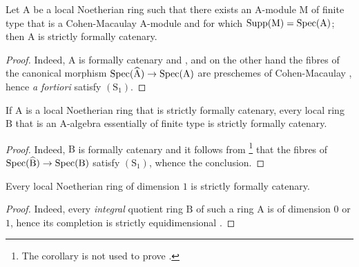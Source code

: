 \begin{corollary}[7.2.7]
\label{IV.7.2.7}
Let $\mathrm{A}$ be a local Noetherian ring such that there exists an $\mathrm{A}$-module $\mathrm{M}$ of finite type that is a Cohen-Macaulay $\mathrm{A}$-module and for which $\operatorname{Supp}(\mathrm{M})=\operatorname{Spec}(\mathrm{A})$; then $\mathrm{A}$ is strictly formally catenary.
\end{corollary}

\begin{proof}
Indeed, $\mathrm{A}$ is formally catenary  and , and on the other hand the fibres of the canonical morphism $\operatorname{Spec}(\widehat{\mathrm{A}})\to\operatorname{Spec}(\mathrm{A})$ are preschemes of Cohen-Macaulay , hence \emph{a fortiori} satisfy $(\mathrm{S}_1)$.
\end{proof}

\begin{corollary}[7.2.8]
\label{IV.7.2.8}
If $\mathrm{A}$ is a local Noetherian ring that is strictly formally catenary, every local ring $\mathrm{B}$ that is an A-algebra essentially of finite type is strictly formally catenary.
\end{corollary}

\begin{proof}
Indeed, $\mathrm{B}$ is formally catenary  and it follows from \footnote{The corollary  is not used to prove .} that the fibres of $\operatorname{Spec}(\widehat{\mathrm{B}})\to\operatorname{Spec}(\mathrm{B})$ satisfy $(\mathrm{S}_1)$, whence the conclusion.
\end{proof}

\begin{corollary}[7.2.9]
\label{IV.7.2.9}
Every local Noetherian ring of dimension $1$ is strictly formally catenary.
\end{corollary}

\begin{proof}
Indeed, every \emph{integral} quotient ring $\mathrm{B}$ of such a ring $\mathrm{A}$ is of dimension $0$ or $1$, hence its completion is strictly equidimensional .
\end{proof}

